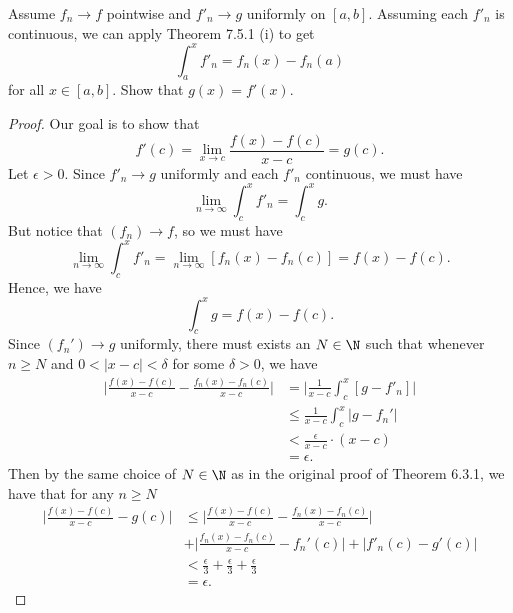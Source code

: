 Assume \( f_{n} \to f  \) pointwise and \( f'_{n} \to g  \) uniformly on \( [a,b]  \). Assuming each \( f'_{n}  \) is continuous, we can apply Theorem 7.5.1 (i) to get 
\[  \int_{ a }^{ x } f'_{n}   = f_{n}(x) - f_{n}(a)  \]
for all \( x \in [a,b]  \). Show that \( g(x) = f'(x) \).


\begin{proof}
Our goal is to show that 
\[  f'(c) = \lim_{ x \to c }  \frac{ f(x) - f(c) }{ x -c  } = g(c). \] Let \( \epsilon > 0  \). Since \( f'_{n} \to g  \) uniformly and each \( f'_{n}  \) continuous, we must have 
\[  \lim_{ n \to \infty  }  \int_{ c }^{ x } f'_{n}   = \int_{ c }^{ x } g.  \]
But notice that \( (f_{n}) \to f  \), so we must have 
\[  \lim_{ n \to \infty  } \int_{ c }^{ x } f'_n = \lim_{ n \to \infty  } [f_{n}(x) - f_{n}(c)] = f(x) - f(c). \] Hence, we have 
\[  \int_{ c }^{ x } g  = f(x) - f(c).\]  Since \( (f_{n}') \to g  \) uniformly, there must exists an \( N \in \N  \) such that whenever \( n \geq N  \) and \( 0 <  | x -c  | < \delta  \) for some \( \delta > 0  \), we have
\begin{align*}
	\Big| \frac{ f(x) - f(c)  }{ x -c  } - \frac{ f_{n}(x) - f_{n}(c)  }{ x -c  }  \Big| &= \Big| \frac{ 1 }{ x -c  } \int_{ c }^{ x } [ g - f'_n]   \Big|  \\
																						 &\leq \frac{ 1 }{ x -c  } \int_{ c }^{ x } | g - f_{n}' |  \\
																						 &< \frac{ \epsilon  }{ x -c  } \cdot ( x -c ) \\
																						 &= \epsilon.
\end{align*}
Then by the same choice of \( N \in \N  \) as in the original proof of Theorem 6.3.1, we have that for any \( n \geq N  \)
\begin{align*}
	\Big| \frac{ f(x) - f(c) }{ x - c   } - g(c) \Big| &\leq \Big| \frac{ f(x) - f(c)  }{ x -c  } - \frac{ f_{n}(x) - f_{n}(c)  }{ x - c  }  \Big| \\  &+ \Big|  \frac{ f_{n}(x) - f_{n}(c)  }{ x -c  } - f_n'(c)  \Big| + | f'_{n}(c) - g'(c)  |   \\
													   &< \frac{ \epsilon  }{ 3  }  + \frac{ \epsilon  }{ 3  } + \frac{ \epsilon  }{ 3  }  \\
													   &= \epsilon.
\end{align*}
\end{proof}





